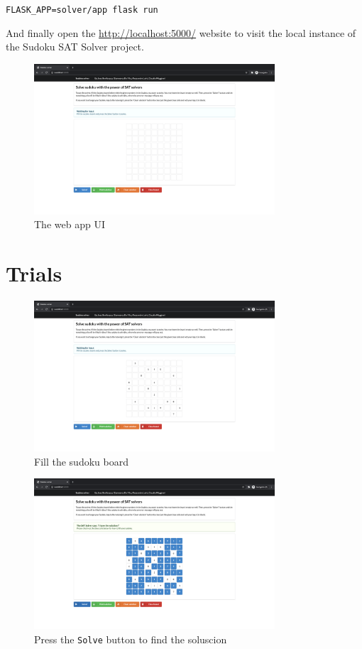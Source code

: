 \documentclass[]{usiinfprospectus}
\begin{document}
\begin{center}
\texttt{FLASK\_APP=solver/app flask run}
\end{center}

\noindent
And finally open the \url{http://localhost:5000/} website to visit the local
instance of the Sudoku SAT Solver project.

\begin{figure}[ht]
\centering
\includegraphics[width=0.8\textwidth]{pics/app_ui.png}
\caption{The web app UI}
\end{figure}

\newpage

\section{Trials}\label{trials}

\begin{figure}[ht]
\centering
\includegraphics[width=0.8\textwidth]{pics/fill_board.png}
\caption{Fill the sudoku board}
\end{figure}

\begin{figure}[ht]
\centering
\includegraphics[width=0.8\textwidth]{pics/solved.png}
\caption{Press the \texttt{Solve} button to find the soluscion}
\end{figure}
\end{document}
